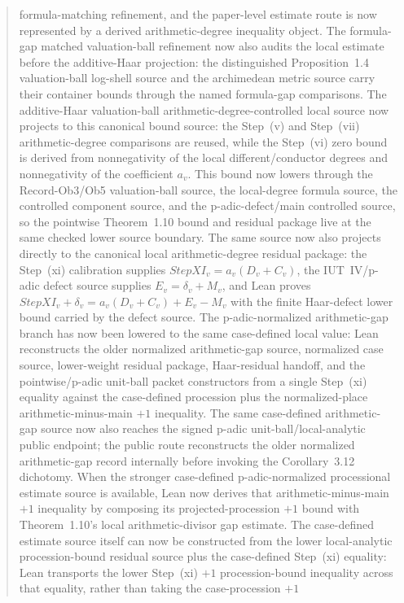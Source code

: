 \documentclass[11pt]{article}
\theoremstyle{plain}
\theoremstyle{definition}
\theoremstyle{remark}
\begin{document}
\begin{abstract}
formula-matching refinement, and the paper-level estimate route is now
represented by a derived arithmetic-degree inequality object.  The
formula-gap matched valuation-ball refinement now also audits the local
estimate before the additive-Haar projection: the distinguished
Proposition~1.4 valuation-ball log-shell source and the archimedean metric
source carry their container bounds through the named formula-gap comparisons.
The
additive-Haar valuation-ball arithmetic-degree-controlled local source now
projects to this canonical bound source: the Step~(v) and Step~(vii)
arithmetic-degree comparisons are reused, while the Step~(vi) zero bound is
derived from nonnegativity of the local different/conductor degrees and
nonnegativity of the coefficient \(a_v\).  This bound now lowers through the
Record-Ob3/Ob5 valuation-ball source, the local-degree formula source, the
controlled component source, and the p-adic-defect/main controlled source, so
the pointwise Theorem~1.10 bound and residual package live at the same checked
lower source boundary.  The same source now also projects directly to the
canonical local arithmetic-degree residual package: the Step~(xi) calibration
supplies \(StepXI_v=a_v(D_v+C_v)\), the IUT~IV/p-adic defect source supplies
\(E_v=\delta_v+M_v\), and Lean proves
\(StepXI_v+\delta_v=a_v(D_v+C_v)+E_v-M_v\) with the finite Haar-defect lower
bound carried by the defect source.
The p-adic-normalized arithmetic-gap branch has now been lowered to the same
case-defined local value: Lean reconstructs the older normalized
arithmetic-gap source, normalized case source, lower-weight residual package,
Haar-residual handoff, and the pointwise/p-adic unit-ball packet constructors
from a single Step~(xi) equality against the case-defined procession plus the
normalized-place arithmetic-minus-main \(+1\) inequality.  The same
case-defined arithmetic-gap source now also reaches the signed p-adic
unit-ball/local-analytic public endpoint; the public route reconstructs the
older normalized arithmetic-gap record internally before invoking the
Corollary~3.12 dichotomy.  When the stronger case-defined p-adic-normalized
processional estimate source is available, Lean now derives that
arithmetic-minus-main \(+1\) inequality by composing its projected-procession
\(+1\) bound with Theorem~1.10's local arithmetic-divisor gap estimate.  The
case-defined estimate source itself can now be constructed from the lower
local-analytic procession-bound residual source plus the case-defined Step~(xi)
equality: Lean transports the lower Step~(xi) \(+1\) procession-bound
inequality across that equality, rather than taking the case-procession \(+1\)

\end{abstract}
\end{document}

